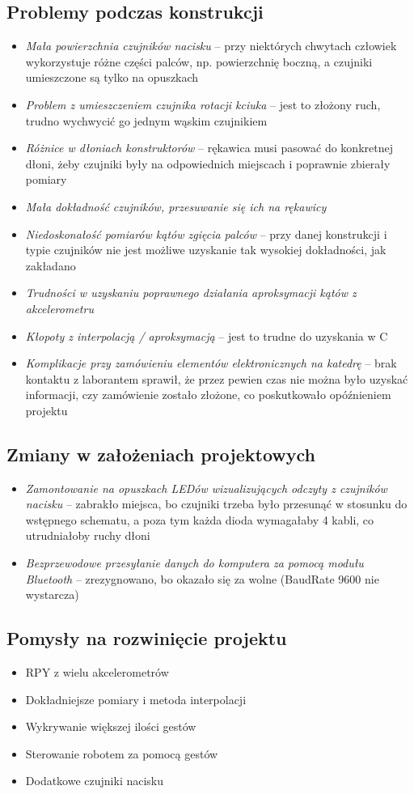 \documentclass[12pt,a4paper]{article}
\begin{document}
\subsection{Problemy podczas konstrukcji}
\begin{itemize}
\item \textit{Mała powierzchnia czujników nacisku} -- przy niektórych chwytach człowiek wykorzystuje różne części palców, np. powierzchnię boczną, a czujniki umieszczone są tylko na opuszkach
\item \textit{Problem z umieszczeniem czujnika rotacji kciuka} -- jest to złożony ruch, trudno wychwycić go jednym wąskim czujnikiem
\item \textit{Różnice w dłoniach konstruktorów} -- rękawica musi pasować do konkretnej dłoni, żeby czujniki były na odpowiednich miejscach i poprawnie zbierały pomiary
\item \textit{Mała dokładność czujników, przesuwanie się ich na rękawicy}
\item \textit{Niedoskonałość pomiarów kątów zgięcia palców} -- przy danej konstrukcji i typie czujników nie jest możliwe uzyskanie tak wysokiej dokładności, jak zakładano
\item \textit{Trudności w uzyskaniu poprawnego działania aproksymacji kątów z akcelerometru}
\item \textit{Kłopoty z interpolacją / aproksymacją} -- jest to trudne do uzyskania w C
\item \textit{Komplikacje przy zamówieniu elementów elektronicznych na katedrę} -- brak kontaktu z laborantem sprawił, że przez pewien czas nie można było uzyskać informacji, czy zamówienie zostało złożone, co poskutkowało opóźnieniem projektu
\end{itemize}
\subsection{Zmiany w założeniach projektowych}
\begin{itemize}
\item \textit{Zamontowanie na opuszkach LEDów wizualizujących odczyty z czujników nacisku} -- zabrakło miejsca, bo czujniki trzeba było przesunąć w stosunku do wstępnego schematu, a poza tym każda dioda wymagałaby 4 kabli, co utrudniałoby ruchy dłoni
\item \textit{Bezprzewodowe przesyłanie danych do komputera za pomocą modułu Bluetooth} -- zrezygnowano, bo okazało się za wolne (BaudRate 9600 nie wystarcza)
\end{itemize}
\subsection{Pomysły na rozwinięcie projektu}
\begin{itemize}
\item RPY z wielu akcelerometrów
\item Dokładniejsze pomiary i metoda interpolacji
\item Wykrywanie większej ilości gestów
\item Sterowanie robotem za pomocą gestów
\item Dodatkowe czujniki nacisku
\end{itemize}
\end{document}
